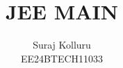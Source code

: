 \documentclass[journal,12pt,twocolumn]{IEEEtran}
\theoremstyle{remark}
\begin{document}
%









\title{JEE MAIN}
\author{Suraj Kolluru

EE24BTECH11033
}	



%
%
%

% 
%



% 
\end{document}
